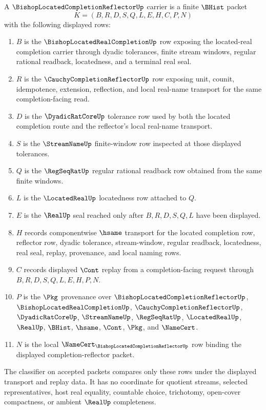 \begin{definition}
\label{def:bishop-located-completion-reflector-carrier}
A $\BishopLocatedCompletionReflectorUp$ carrier is a finite $\BHist$ packet
$$
K=(B,R,D,S,Q,L,E,H,C,P,N)
$$
with the following displayed rows:
\begin{enumerate}
\item $B$ is the $\BishopLocatedRealCompletionUp$ row exposing the located-real completion carrier through dyadic tolerances, finite stream windows, regular rational readback, locatedness, and a terminal real seal.
\item $R$ is the $\CauchyCompletionReflectorUp$ row exposing unit, counit, idempotence, extension, reflection, and local real-name transport for the same completion-facing read.
\item $D$ is the $\DyadicRatCoreUp$ tolerance row used by both the located completion route and the reflector's local real-name transport.
\item $S$ is the $\StreamNameUp$ finite-window row inspected at those displayed tolerances.
\item $Q$ is the $\RegSeqRatUp$ regular rational readback row obtained from the same finite windows.
\item $L$ is the $\LocatedRealUp$ locatedness row attached to $Q$.
\item $E$ is the $\RealUp$ seal reached only after $B,R,D,S,Q,L$ have been displayed.
\item $H$ records componentwise $\hsame$ transport for the located completion row, reflector row, dyadic tolerance, stream-window, regular readback, locatedness, real seal, replay, provenance, and local naming rows.
\item $C$ records displayed $\Cont$ replay from a completion-facing request through $B,R,D,S,Q,L,E,H,P,N$.
\item $P$ is the $\Pkg$ provenance over $\BishopLocatedCompletionReflectorUp$, $\BishopLocatedRealCompletionUp$, $\CauchyCompletionReflectorUp$, $\DyadicRatCoreUp$, $\StreamNameUp$, $\RegSeqRatUp$, $\LocatedRealUp$, $\RealUp$, $\BHist$, $\hsame$, $\Cont$, $\Pkg$, and $\NameCert$.
\item $N$ is the local $\NameCert_{\BishopLocatedCompletionReflectorUp}$ row binding the displayed completion-reflector packet.
\end{enumerate}
The classifier on accepted packets compares only these rows under the displayed transport and replay data. It has no coordinate for quotient streams, selected representatives, host real equality, countable choice, trichotomy, open-cover compactness, or ambient $\RealUp$ completeness.
\end{definition}

